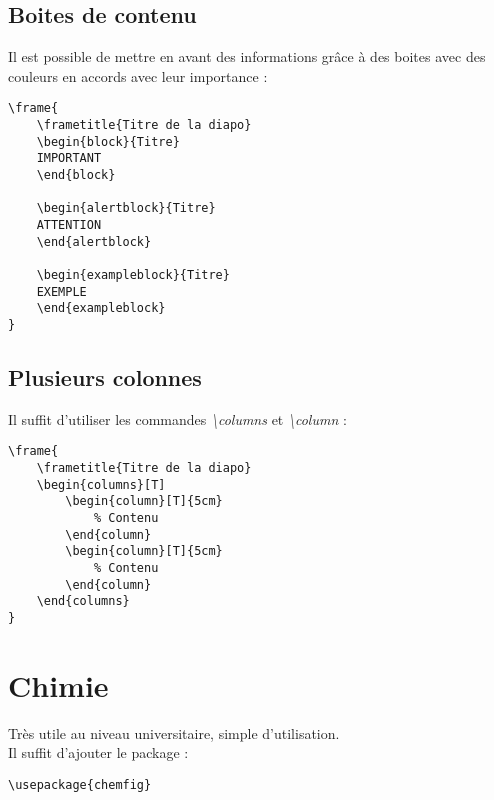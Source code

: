     \subsection{Boites de contenu}
        Il est possible de mettre en avant des informations grâce à des boites avec des couleurs en accords avec leur importance :
        \begin{lstlisting}
\frame{
    \frametitle{Titre de la diapo}
    \begin{block}{Titre}
    IMPORTANT
    \end{block}

    \begin{alertblock}{Titre}
    ATTENTION
    \end{alertblock}

    \begin{exampleblock}{Titre}
    EXEMPLE
    \end{exampleblock}
}
        \end{lstlisting}

    \subsection{Plusieurs colonnes}
        Il suffit d'utiliser les commandes \textit{\textbackslash columns} et \textit{\textbackslash column} :
        \begin{lstlisting}
\frame{
    \frametitle{Titre de la diapo}
    \begin{columns}[T]
        \begin{column}[T]{5cm}
            % Contenu
        \end{column}
        \begin{column}[T]{5cm}
            % Contenu
        \end{column}
    \end{columns}
}
        \end{lstlisting}

\section{Chimie}
    Très utile au niveau universitaire, simple d'utilisation.\\
    Il suffit d'ajouter le package :
    \begin{lstlisting}
\usepackage{chemfig}
    \end{lstlisting}
